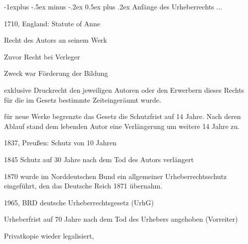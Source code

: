 \documentclass[a4paper]{article}
\makeatletter
\renewcommand{\subsection}{\@startsection{subsection}{2}{0mm}%
                                {-1explus -.5ex minus -.2ex}%
                                {0.5ex plus .2ex}%
                                {\normalfont\normalsize\bfseries}}
\makeatother
\begin{document}
\begin{multicols*}{2}
  \subsection{Anfänge des Urheberrechts ...}
  \begin{itemize*}
    \item 1710, England: Statute of Anne
    \begin{itemize*}
      \item Recht des Autors an seinem Werk
      \item Zuvor Recht bei Verleger
      \item Zweck war Förderung der Bildung
      \item exklusive Druckrecht den jeweiligen Autoren oder den Erwerbern dieses Rechts für die im Gesetz bestimmte Zeiteingeräumt wurde.
      \item für neue Werke begrenzte das Gesetz die Schutzfrist auf 14 Jahre. Nach deren Ablauf stand dem lebenden Autor eine Verlängerung um weitere 14 Jahre zu.
    \end{itemize*}
    \item 1837, Preußen: Schutz von 10 Jahren
    \item 1845 Schutz auf 30 Jahre nach dem Tod des Autors verlängert
    \item 1870 wurde im Norddeutschen Bund ein allgemeiner Urheberrechtsschutz eingeführt, den das Deutsche Reich 1871 übernahm.
    \item 1965, BRD deutsche Urheberrechtsgesetz (UrhG)
    \begin{itemize*}
      \item Urheberfrist auf 70 Jahre nach dem Tod des Urhebers angehoben (Vorreiter)
      \item Privatkopie wieder legalisiert,
    \end{itemize*}
  \end{itemize*}


\end{multicols*}
\end{document}
